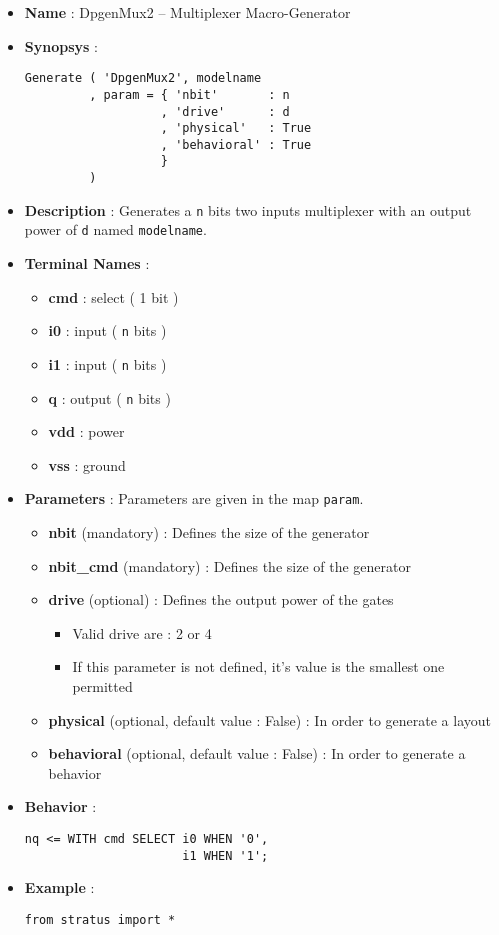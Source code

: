 \begin{itemize}
    \item \textbf{Name} : DpgenMux2 -- Multiplexer Macro-Generator
    \item \textbf{Synopsys} :
\begin{verbatim}
Generate ( 'DpgenMux2', modelname
         , param = { 'nbit'       : n
                   , 'drive'      : d
                   , 'physical'   : True
                   , 'behavioral' : True                   
                   }
         )
\end{verbatim}
    \item \textbf{Description} : Generates a \verb-n- bits two inputs multiplexer with an output power of \verb-d- named \verb-modelname-.
    \item \textbf{Terminal Names} :
    \begin{itemize}
        \item \textbf{cmd} : select ( 1 bit )
        \item \textbf{i0} : input ( \verb-n- bits )
        \item \textbf{i1} : input ( \verb-n- bits )
        \item \textbf{q} : output ( \verb-n- bits )
        \item \textbf{vdd} : power
        \item \textbf{vss} : ground
    \end{itemize}
    \item \textbf{Parameters} : Parameters are given in the map \verb-param-.
    \begin{itemize}
        \item \textbf{nbit} (mandatory) : Defines the size of the generator
        \item \textbf{nbit\_cmd} (mandatory) : Defines the size of the generator
        \item \textbf{drive} (optional) : Defines the output power of the gates
        \begin{itemize}
            \item Valid drive are : 2 or 4
            \item If this parameter is not defined, it's value is the smallest one permitted
        \end{itemize}
        \item \textbf{physical} (optional, default value : False) : In order to generate a layout
        \item \textbf{behavioral} (optional, default value : False) : In order to generate a behavior        
    \end{itemize}
    \item \textbf{Behavior} :
\begin{verbatim}
nq <= WITH cmd SELECT i0 WHEN '0',
                      i1 WHEN '1';
\end{verbatim}
    \item \textbf{Example} :
\begin{verbatim}
from stratus import *


\end{verbatim}
\end{itemize}
